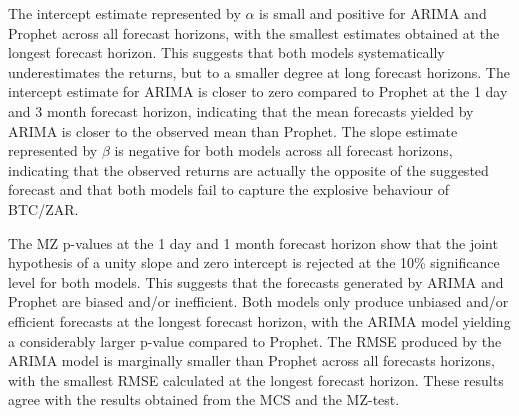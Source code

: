 \documentclass[12pt,a4paper]{article}
\numberwithin{equation}{section}
\numberwithin{figure}{section}
\numberwithin{table}{section}
\let\origtable\table
\let\endorigtable\endtable
\renewenvironment{table}[1][2] {
    \expandafter\origtable\expandafter[H]
} {
    \endorigtable
}
\begin{document}
\begin{table}[H]
\centering
\caption{MCS, MZ-test and RMSE results based on clean data \label{tab1}} 
\end{table}

The intercept estimate represented by \(\alpha\) is small and positive
for ARIMA and Prophet across all forecast horizons, with the smallest
estimates obtained at the longest forecast horizon. This suggests that
both models systematically underestimates the returns, but to a smaller
degree at long forecast horizons. The intercept estimate for ARIMA is
closer to zero compared to Prophet at the 1 day and 3 month forecast
horizon, indicating that the mean forecasts yielded by ARIMA is closer
to the observed mean than Prophet. The slope estimate represented by
\(\beta\) is negative for both models across all forecast horizons,
indicating that the observed returns are actually the opposite of the
suggested forecast and that both models fail to capture the explosive
behaviour of BTC/ZAR.

The MZ p-values at the 1 day and 1 month forecast horizon show that the
joint hypothesis of a unity slope and zero intercept is rejected at the
10\% significance level for both models. This suggests that the
forecasts generated by ARIMA and Prophet are biased and/or inefficient.
Both models only produce unbiased and/or efficient forecasts at the
longest forecast horizon, with the ARIMA model yielding a considerably
larger p-value compared to Prophet. The RMSE produced by the ARIMA model
is marginally smaller than Prophet across all forecasts horizons, with
the smallest RMSE calculated at the longest forecast horizon. These
results agree with the results obtained from the MCS and the MZ-test.
\end{document}
